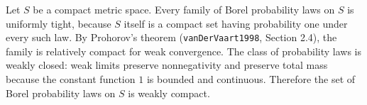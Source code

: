 Let \(S\) be a compact metric space.  Every family of Borel probability laws on \(S\) is uniformly tight, because \(S\) itself is a compact set having probability one under every such law.  By Prohorov's theorem (\texttt{vanDerVaart1998}, Section 2.4), the family is relatively compact for weak convergence.  The class of probability laws is weakly closed: weak limits preserve nonnegativity and preserve total mass because the constant function \(1\) is bounded and continuous.  Therefore the set of Borel probability laws on \(S\) is weakly compact.